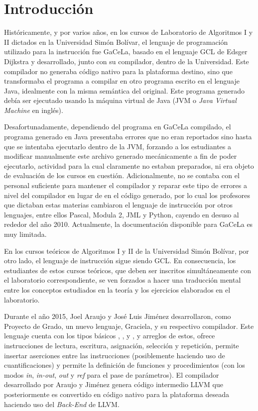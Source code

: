 \chapter*{Introducción}
\label{intro}

Históricamente, y por varios años, en los cursos de Laboratorio de Algoritmos I
y II dictados en la Universidad Simón Bolívar, el lenguaje de programación
utilizado para la instrucción fue GaCeLa, basado en el lenguaje GCL de Edsger
Dijkstra y desarrollado, junto con su compilador, dentro de la Universidad. Este
compilador no generaba código nativo para la plataforma destino, sino que
transformaba el programa a compilar en otro programa escrito en el lenguaje
Java, idealmente con la misma semántica del original. Este programa generado
debía ser ejecutado usando la máquina virtual de Java (JVM o \textit{Java
Virtual Machine} en inglés).

Desafortunadamente, dependiendo del programa en GaCeLa compilado, el programa
generado en Java presentaba errores que no eran reportados sino hasta que se
intentaba ejecutarlo dentro de la JVM, forzando a los estudiantes a modificar
manualmente este archivo generado mecánicamente a fin de poder ejecutarlo,
actividad para la cual claramente no estaban preparados, ni era objeto de
evaluación de los cursos en cuestión. Adicionalmente, no se contaba con el
personal suficiente para mantener el compilador y reparar este tipo de errores a
nivel del compilador en lugar de en el código generado, por lo cual los
profesores que dictaban estas materias cambiaron el lenguaje de instrucción por
otros lenguajes, entre ellos Pascal, Modula 2, JML y Python, cayendo en desuso
al rededor del año 2010. Actualmente, la documentación disponible para GaCeLa es
muy limitada.

En los cursos teóricos de Algoritmos I y II de la Universidad Simón Bolívar, por
otro lado, el lenguaje de instrucción sigue siendo GCL. En consecuencia, los
estudiantes de estos cursos teóricos, que deben ser inscritos simultáneamente
con el laboratorio correspondiente, se ven forzados a hacer una traducción
mental entre los conceptos estudiados en la teoría y los ejercicios elaborados
en el laboratorio.

Durante el año 2015, Joel Araujo y José Luis Jiménez desarrollaron, como
Proyecto de Grado, un nuevo lenguaje, Graciela, y su respectivo compilador. Este
lenguaje cuenta con los tipos básicos , ,  y
, y arreglos de estos, ofrece instrucciones de lectura,
escritura, asignación, selección y repetición, permite insertar aserciones entre
las instrucciones (posiblemente haciendo uso de cuantificaciones) y permite la
definición de funciones y procedimientos (con los modos \textit{in},
\textit{in-out}, \textit{out} y \textit{ref} para el pase de parámetros). El
compilador desarrollado por Araujo y Jiménez genera código intermedio LLVM que
posteriormente es convertido en código nativo para la plataforma deseada
haciendo uso del \textit{Back-End} de LLVM.

